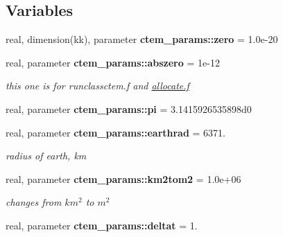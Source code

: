 \subsection*{Variables}
\begin{DoxyCompactItemize}
\item 
\hypertarget{namespacectem__params_ae9ff6c0605fc5861fe02dff5340c22d7}{}real, dimension(kk), parameter {\bfseries ctem\+\_\+params\+::zero} = 1.\+0e-\/20\label{namespacectem__params_ae9ff6c0605fc5861fe02dff5340c22d7}

\item 
\hypertarget{namespacectem__params_ac207816bca09bac9b87c4e17ba7dfee1}{}real, parameter {\bfseries ctem\+\_\+params\+::abszero} = 1e-\/12\label{namespacectem__params_ac207816bca09bac9b87c4e17ba7dfee1}

\begin{DoxyCompactList}\small\item\em this one is for runclassctem.\+f and \hyperlink{allocate_8f}{allocate.\+f} \end{DoxyCompactList}\item 
\hypertarget{namespacectem__params_add603c0bfb6c468101dbdcc710f98703}{}real, parameter {\bfseries ctem\+\_\+params\+::pi} = 3.\+1415926535898d0\label{namespacectem__params_add603c0bfb6c468101dbdcc710f98703}

\item 
\hypertarget{namespacectem__params_a543d5b22d79302823fd389c0f869c384}{}real, parameter {\bfseries ctem\+\_\+params\+::earthrad} = 6371.\label{namespacectem__params_a543d5b22d79302823fd389c0f869c384}

\begin{DoxyCompactList}\small\item\em radius of earth, km \end{DoxyCompactList}\item 
\hypertarget{namespacectem__params_a7d03b303154efb0e76c58c9c03a55e06}{}real, parameter {\bfseries ctem\+\_\+params\+::km2tom2} = 1.\+0e+06\label{namespacectem__params_a7d03b303154efb0e76c58c9c03a55e06}

\begin{DoxyCompactList}\small\item\em changes from $km^2$ to $m^2$ \end{DoxyCompactList}\item 
\hypertarget{namespacectem__params_a0eda7d3a6fad697a660806095840a1fb}{}real, parameter {\bfseries ctem\+\_\+params\+::deltat} = 1.\label{namespacectem__params_a0eda7d3a6fad697a660806095840a1fb}


\end{DoxyCompactItemize}
